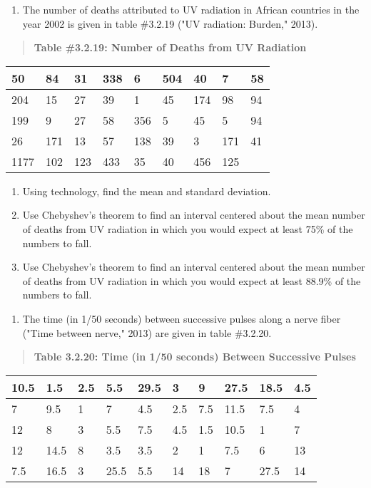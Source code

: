 \documentclass[]{book}
\providecommand{\tightlist}{%
  \setlength{\itemsep}{0pt}\setlength{\parskip}{0pt}}
\begin{document}
\begin{enumerate}
\def\labelenumi{\arabic{enumi}.}
\setcounter{enumi}{12}
\tightlist
\item
  The number of deaths attributed to UV radiation in African countries
  in the year 2002 is given in table \#3.2.19 ("UV radiation:
  Burden," 2013).
\end{enumerate}

\begin{quote}
\textbf{Table \#3.2.19: Number of Deaths from UV Radiation}
\end{quote}

\begin{longtable}[]{@{}lllllllll@{}}
\toprule
50 & 84 & 31 & 338 & 6 & 504 & 40 & 7 & 58\tabularnewline
\midrule
\endhead
204 & 15 & 27 & 39 & 1 & 45 & 174 & 98 & 94\tabularnewline
199 & 9 & 27 & 58 & 356 & 5 & 45 & 5 & 94\tabularnewline
26 & 171 & 13 & 57 & 138 & 39 & 3 & 171 & 41\tabularnewline
1177 & 102 & 123 & 433 & 35 & 40 & 456 & 125 &\tabularnewline
\bottomrule
\end{longtable}

\begin{enumerate}
\def\labelenumi{\alph{enumi}.}
\item
  Using technology, find the mean and standard deviation.
\item
  Use Chebyshev's theorem to find an interval centered about the mean
  number of deaths from UV radiation in which you would expect at
  least 75\% of the numbers to fall.
\item
  Use Chebyshev's theorem to find an interval centered about the mean
  number of deaths from UV radiation in which you would expect at
  least 88.9\% of the numbers to fall.
\end{enumerate}

\begin{enumerate}
\def\labelenumi{\arabic{enumi}.}
\setcounter{enumi}{13}
\tightlist
\item
  The time (in 1/50 seconds) between successive pulses along a nerve
  fiber ("Time between nerve," 2013) are given in table \#3.2.20.
\end{enumerate}

\begin{quote}
\textbf{Table 3.2.20: Time (in 1/50 seconds) Between Successive Pulses}
\end{quote}

\begin{longtable}[]{@{}llllllllll@{}}
\toprule
10.5 & 1.5 & 2.5 & 5.5 & 29.5 & 3 & 9 & 27.5 & 18.5 & 4.5\tabularnewline
\midrule
\endhead
7 & 9.5 & 1 & 7 & 4.5 & 2.5 & 7.5 & 11.5 & 7.5 & 4\tabularnewline
12 & 8 & 3 & 5.5 & 7.5 & 4.5 & 1.5 & 10.5 & 1 & 7\tabularnewline
12 & 14.5 & 8 & 3.5 & 3.5 & 2 & 1 & 7.5 & 6 & 13\tabularnewline
7.5 & 16.5 & 3 & 25.5 & 5.5 & 14 & 18 & 7 & 27.5 & 14\tabularnewline
\bottomrule
\end{longtable}
\end{document}
